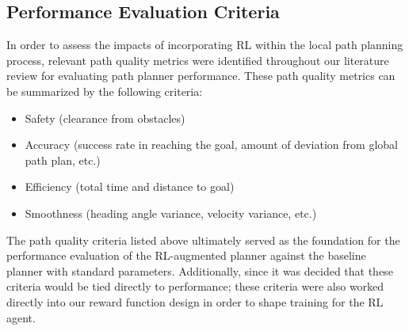 \documentclass[conference]{IEEEtran}
\begin{document}
    \subsection{Performance Evaluation Criteria}
    In order to assess the impacts of incorporating RL within the local path planning process, relevant path quality metrics were identified throughout our literature review for evaluating path planner performance. These path quality metrics can be summarized by the following criteria:
    \begin{itemize}
        \item Safety (clearance from obstacles)
        \item Accuracy (success rate in reaching the goal, amount of deviation from global path plan, etc.)
        \item Efficiency (total time and distance to goal)
        \item Smoothness (heading angle variance, velocity variance, etc.)
    \end{itemize}

    The path quality criteria listed above ultimately served as the foundation for the performance evaluation of the RL-augmented planner against the baseline planner with standard parameters. Additionally, since it was decided that these criteria would be tied directly to performance; these criteria were also worked directly into our reward function design in order to shape training for the RL agent.
\end{document}
